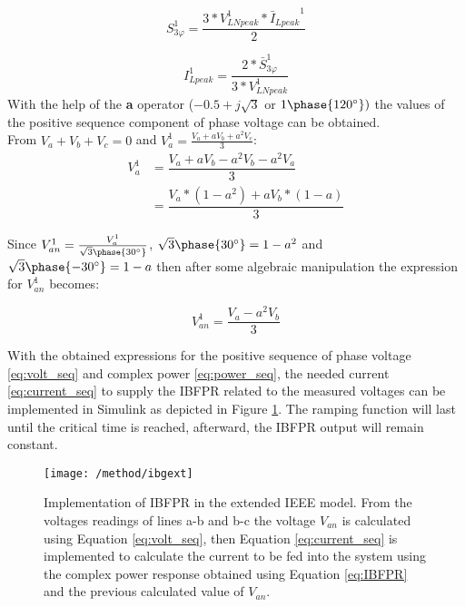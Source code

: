 \begin{equation}
\label{eq:power_seq}
S_{3\varphi}^1=\dfrac{3*V_{LNpeak}^1*{\bar I_{Lpeak}}^1}{2}
\end{equation}


\begin{equation}
\label{eq:current_seq}
I_{Lpeak}^1=\dfrac{2*\bar{S}_{3\varphi}^1}{3*V_{LNpeak}^1}
\end{equation}
With the help of the \textbf{a} operator ($-0.5+j\sqrt{3}$ or $ 1\phase{120^{\circ}}) $ the values of the positive sequence component of phase voltage can be obtained. \\
From $ V_a +V_b+V_c=0$ and $ V_a^1=\frac{V_a+ aV_b+a^2 V_c}{3} $:
\begin{align*}
V_a^1 & =\dfrac{V_a+ aV_b-a^2 V_b-a^2V_a}{3} \\
& =\dfrac{V_a*(1-a^2)+ aV_b*(1-a)}{3}
\end{align*}

Since $V_{an}^1=\frac{V_a^1}{\sqrt{3}\phase{30^{\circ}}}$, $\sqrt{3}\phase{30^{\circ}}=1-a^2 $ and $ \sqrt{3}\phase{-30^{\circ}}=1-a $ then after some algebraic manipulation the expression for $ V_{an}^1 $ becomes:

\begin{equation}
\label{eq:volt_seq}
V_{an}^1=\dfrac{V_a-a^2 V_b}{3}
\end{equation}

With the obtained expressions for the positive sequence of phase voltage \eqref{eq:volt_seq} and complex power \eqref{eq:power_seq}, the needed current \eqref{eq:current_seq} to supply the IBFPR related to the measured voltages can be implemented in Simulink as depicted in Figure \ref{fig:ieeeext_ibfpr}. The ramping function will last until the critical time is reached, afterward, the IBFPR output will remain constant.

\begin{figure}[h]
	\centering
	\texttt{[image: /method/ibgext]}
	\caption{Implementation of IBFPR in the extended IEEE model. From the voltages readings of lines a-b and b-c the voltage $ V_{an} $ is calculated using Equation \eqref{eq:volt_seq}, then Equation \eqref{eq:current_seq} is implemented to calculate the current to be fed into the system using the complex power response obtained using Equation \eqref{eq:IBFPR} and the previous calculated value of $ V_{an} $.}
	\label{fig:ieeeext_ibfpr}
\end{figure}

